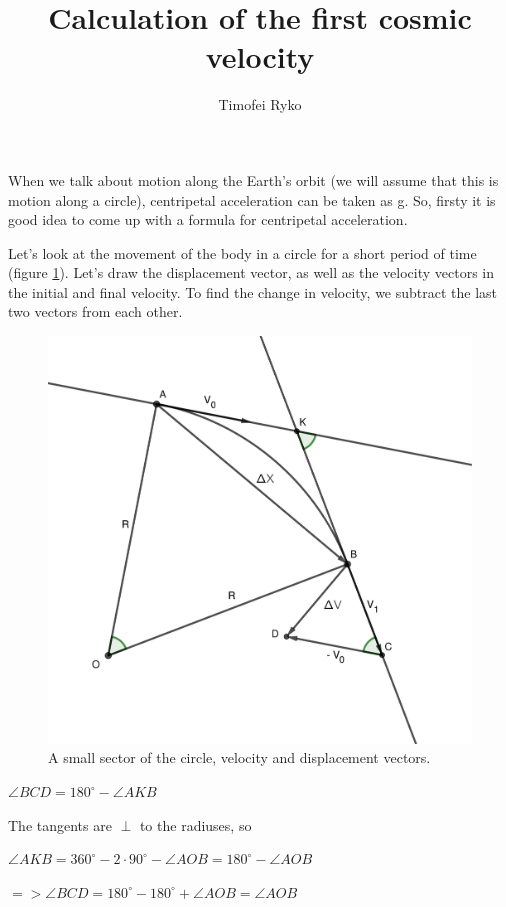\documentclass[a4paper,10pt]{article}
\title{Calculation of the first cosmic velocity}
\author{Timofei Ryko}
\begin{document}
\maketitle
When we talk about motion along the Earth's orbit (we will assume that this is motion along a circle), centripetal acceleration can be taken as g. So, firsty it is good idea to come up with a formula for centripetal acceleration.
\par
Let's look at the movement of the body in a circle for a short period of time (figure \ref{fig:1}). Let's draw the displacement vector, as well as the velocity vectors in the initial and final velocity. To find the change in velocity, we subtract the last two vectors from each other.
\begin{figure}[h]
    \centering
    \includegraphics[width=1\textwidth,
    trim={1cm 1cm 1cm 1cm},clip]{figure.pdf}
    \caption{A small sector of the circle, velocity and displacement vectors.}
    \label{fig:1}
\end{figure}
\newpage
\par
$\angle BCD = 180^{\circ} - \angle AKB$
\par
The tangents are $\perp$ to the radiuses, so
\par
$\angle AKB = 360^{\circ} - 2 \cdot 90^{\circ} - \angle AOB =
180^{\circ} - \angle AOB$
\par
$=> \angle BCD = 180^{\circ} - 180^{\circ} + \angle AOB = \angle AOB$
\end{document}
